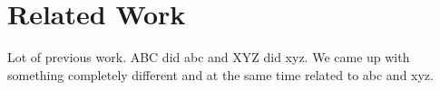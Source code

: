 \section{Related Work}

Lot of previous work. ABC did abc and XYZ did xyz. We came up with something completely different and
at the same time related to abc and xyz.
